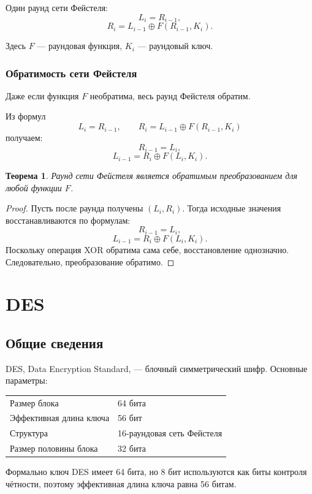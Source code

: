 \documentclass[12pt,a4paper]{article}
\newtheorem{theorem}{Теорема}
\begin{document}
Один раунд сети Фейстеля:
\[
    L_i = R_{i-1},
\]
\[
    R_i = L_{i-1} \oplus F(R_{i-1},K_i).
\]

Здесь $F$ --- раундовая функция, $K_i$ --- раундовый ключ.

\subsubsection*{Обратимость сети Фейстеля}

Даже если функция $F$ необратима, весь раунд Фейстеля обратим.

Из формул
\[
    L_i=R_{i-1},\qquad R_i=L_{i-1}\oplus F(R_{i-1},K_i)
\]
получаем:
\[
    R_{i-1}=L_i,
\]
\[
    L_{i-1}=R_i\oplus F(L_i,K_i).
\]

\begin{theorem}
Раунд сети Фейстеля является обратимым преобразованием для любой функции $F$.
\end{theorem}

\begin{proof}
Пусть после раунда получены $(L_i,R_i)$. Тогда исходные значения восстанавливаются по формулам:
\[
    R_{i-1}=L_i,
\]
\[
    L_{i-1}=R_i\oplus F(L_i,K_i).
\]
Поскольку операция XOR обратима сама себе, восстановление однозначно. Следовательно, преобразование обратимо.
\end{proof}

\section{DES}

\subsection{Общие сведения}

DES, Data Encryption Standard, --- блочный симметрический шифр. Основные параметры:

\begin{center}
\begin{tabular}{ll}
\toprule
Размер блока & 64 бита \\
Эффективная длина ключа & 56 бит \\
Структура & 16-раундовая сеть Фейстеля \\
Размер половины блока & 32 бита \\
\bottomrule
\end{tabular}
\end{center}

Формально ключ DES имеет 64 бита, но 8 бит используются как биты контроля чётности, поэтому эффективная длина ключа равна 56 битам.
\end{document}
